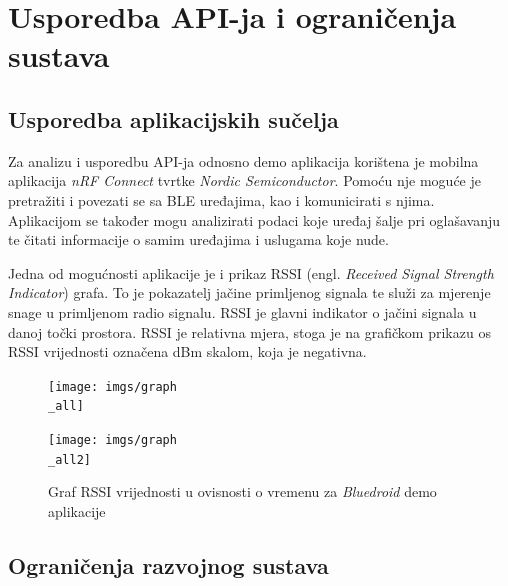 \chapter{Usporedba API-ja i ograničenja sustava}

\section{Usporedba aplikacijskih sučelja}

Za analizu i usporedbu API-ja odnosno demo aplikacija korištena je mobilna aplikacija \textit{nRF Connect} tvrtke \textit{Nordic Semiconductor}. Pomoću nje moguće je pretražiti i povezati se sa BLE uređajima, kao i komunicirati s njima. Aplikacijom se također mogu analizirati podaci koje uređaj šalje pri oglašavanju te čitati informacije o samim uređajima i uslugama koje nude. \cite{nrfapp}

Jedna od mogućnosti aplikacije je i prikaz RSSI (engl. \textit{Received Signal Strength Indicator}) grafa. To je pokazatelj jačine primljenog signala te služi za mjerenje snage u primljenom radio signalu. RSSI je glavni indikator o jačini signala u danoj točki prostora. RSSI je relativna mjera, stoga je na grafičkom prikazu os RSSI vrijednosti označena dBm skalom, koja je negativna. 

\begin{figure}[ht]
	\begin{minipage}[t]{0.4\textwidth}
		\texttt{[image: imgs/graph\\\_all]}
		\label{fig:graph_all}
	\end{minipage}
	\hspace*{\fill}
	\begin{minipage}[t]{0.4\textwidth}
		\texttt{[image: imgs/graph\\\_all2]}
		\label{fig:graph_all2}
	\end{minipage}
	\caption{Graf RSSI vrijednosti u ovisnosti o vremenu za \textit{Bluedroid} demo aplikacije}
\end{figure}

\section{Ograničenja razvojnog sustava}

